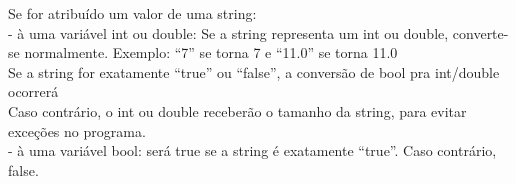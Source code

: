 \documentclass[12pt,a4paper]{article}
\begin{document}
Se for atribuído um valor de uma string:\\
- à uma variável int ou double: Se a string representa um int ou double, converte-se normalmente. Exemplo: ``7'' se torna 7 e ``11.0'' se torna 11.0\\
Se a string for exatamente ``true'' ou ``false'', a conversão de bool pra int/double ocorrerá\\
Caso contrário, o int ou double receberão o tamanho da string, para evitar exceções no programa.\\
- à uma variável bool: será true se a string é exatamente ``true''. Caso contrário, false.\\
\end{document}
